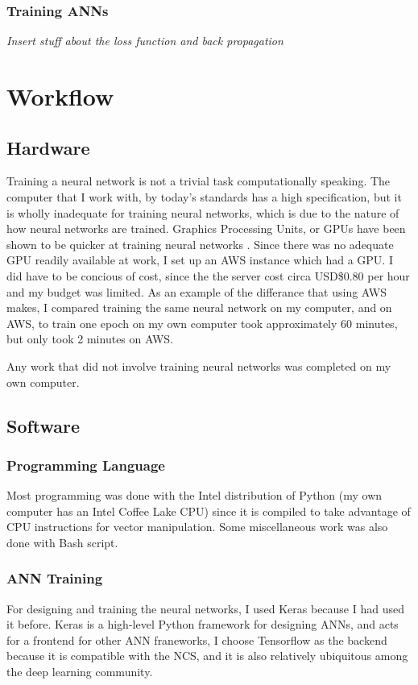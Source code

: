           \subsubsection{Training ANNs}
          {\slshape Insert stuff about the loss function and back propagation}
    
    \section{Workflow}
        \subsection{Hardware}
        Training a neural network is not a trivial task computationally speaking. The computer that I work with, by today's standards has a high specification, but it is wholly inadequate for training neural networks, which is due to the nature of how neural networks are trained. Graphics Processing Units, or GPUs have been shown to be quicker at training neural networks \cite{OH20041311}. Since there was no adequate GPU readily available at work, I set up an AWS instance which had a GPU. I did have to be concious of cost, since the the server cost circa USD\$0.80 per hour and my budget was limited. As an example of the differance that using AWS makes, I compared training the same neural network on my computer, and on AWS, to train one epoch on my own computer took approximately 60 minutes, but only took 2 minutes on AWS.

        Any work that did not involve training neural networks was completed on my own computer.

        \subsection{Software}
            \subsubsection{Programming Language}
            Most programming was done with the Intel distribution of Python (my own computer has an Intel Coffee Lake CPU) since it is compiled to take advantage of CPU instructions for vector manipulation. Some miscellaneous work was also done with Bash script.

            \subsubsection{ANN Training}
            For designing and training the neural networks, I used Keras \cite{chollet2015keras} because I had used it before. Keras is a high-level Python framework for designing ANNs, and acts for a frontend for other ANN franeworks, I choose Tensorflow \cite{tensorflow2015-whitepaper} as the backend because it is compatible with the NCS, and it is also relatively ubiquitous among the deep learning community.

